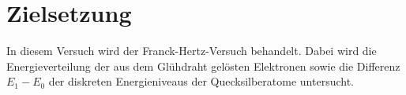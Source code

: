 




\section{Zielsetzung}

In diesem Versuch wird der Franck-Hertz-Versuch behandelt.
Dabei wird die Energieverteilung der aus dem Glühdraht gelösten Elektronen
sowie die Differenz $E_1 - E_0$ der diskreten Energieniveaus der Quecksilberatome untersucht.
